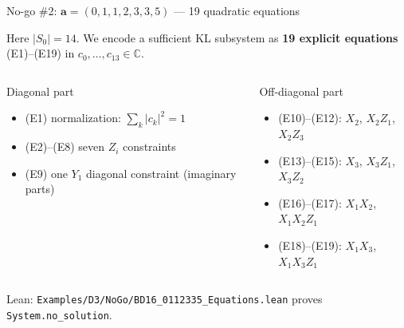 \documentclass[aspectratio=169,t]{beamer}
\newcommand{\CC}{\mathbb{C}}
\newcommand{\code}[1]{\texttt{\small #1}}
\begin{document}
\begin{frame}{No-go \#2: $\mathbf{a}=(0,1,1,2,3,3,5)$ --- 19 quadratic equations}

Here $|S_0|=14$. We encode a sufficient KL subsystem as \textbf{19 explicit equations}
(E1)--(E19) in $c_0,\dots,c_{13}\in\CC$.

\begin{columns}[T]
\begin{block}{Diagonal part}
\begin{itemize}\setlength\itemsep{2pt}
\item (E1) normalization: $\sum_k |c_k|^2 = 1$
\item (E2)--(E8) seven $Z_i$ constraints
\item (E9) one $Y_1$ diagonal constraint (imaginary parts)
\end{itemize}
\end{block}

\begin{alertblock}{Off-diagonal part}
\begin{itemize}\setlength\itemsep{2pt}
\item (E10)--(E12): $X_2$, $X_2Z_1$, $X_2Z_3$
\item (E13)--(E15): $X_3$, $X_3Z_1$, $X_3Z_2$
\item (E16)--(E17): $X_1X_2$, $X_1X_2Z_1$
\item (E18)--(E19): $X_1X_3$, $X_1X_3Z_1$
\end{itemize}
\end{alertblock}
\end{columns}

\textcolor{Slate}{\small Lean: \code{Examples/D3/NoGo/BD16\_0112335\_Equations.lean} proves \code{System.no\_solution}.}
\end{frame}
\end{document}
